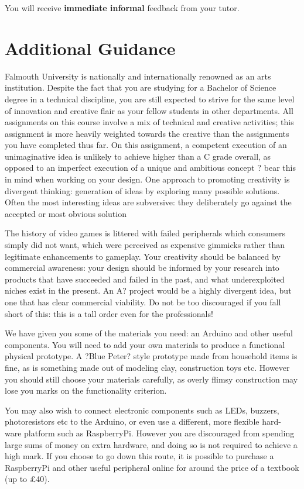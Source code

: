 \documentclass{../fal_assignment}
\begin{document}
You will receive \textbf{immediate informal} feedback from your tutor.

\section*{Additional Guidance}
Falmouth University is nationally and internationally renowned as an arts institution. Despite the fact that you are studying for a Bachelor of Science degree in a technical discipline, you are still expected to strive for the same level of innovation and creative flair as your fellow students in other departments. All assignments on this course involve a mix of technical and creative activities; this assignment is more heavily weighted towards the creative than the assignments you have completed thus far. On this assignment, a competent execution of an unimaginative idea is unlikely to achieve higher than a C grade overall, as opposed to an imperfect execution of a unique and ambitious concept ? bear this in mind when working on your design. One approach to promoting creativity is divergent thinking: generation of ideas by exploring many possible solutions. Often the most interesting ideas are subversive: they deliberately go against the accepted or most obvious solution 

The history of video games is littered with failed peripherals which consumers simply did not want, which were perceived as expensive gimmicks rather than legitimate enhancements to gameplay. Your creativity should be balanced by commercial awareness: your design should be informed by your research into products that have succeeded and failed in the past, and what underexploited niches exist in the present. An A? project would be a highly divergent idea, but one that has clear commercial viability. Do not be too discouraged if you fall short of this: this is a tall order even for the professionals! 

We have given you some of the materials you need: an Arduino and other useful components. You will need to add your own materials to produce a functional physical prototype. A ?Blue Peter? style prototype made from household items is fine, as is something made out of modeling clay, construction toys etc. However you should still choose your materials carefully, as overly flimsy construction may lose you marks on the functionality criterion. 

You may also wish to connect electronic components such as LEDs, buzzers, photoresistors etc to the Arduino, or even use a different, more flexible hard- ware platform such as RaspberryPi. However you are discouraged from spending large sums of money on extra hardware, and doing so is not required to achieve a high mark. If you choose to go down this route, it is possible to purchase a RaspberryPi and other useful peripheral online for around the price of a textbook (up to \pounds40). 
\end{document}
